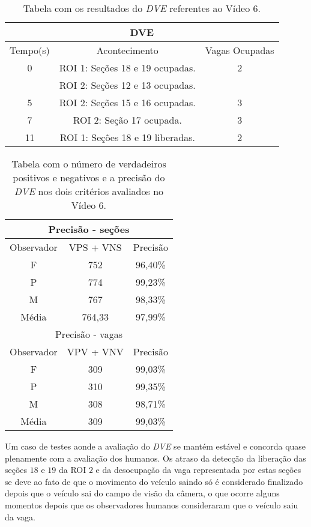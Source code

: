 \begin{table}[H]
\begin{center}
\begin{tabular}{|c||c||c|}
\hline
\multicolumn{3}{|c|}{DVE}  \\ \hline \hline
Tempo(s) & Acontecimento & Vagas Ocupadas \\ \hline
0 & ROI 1: Seções 18 e 19 ocupadas. & 2 \\
 & ROI 2: Seções 12 e 13 ocupadas. &  \\ \hline
5 & ROI 2: Seções 15 e 16 ocupadas. & 3 \\ \hline
7 & ROI 2: Seção 17 ocupada. & 3 \\ \hline
11 & ROI 1: Seções 18 e 19 liberadas. & 2 \\
\hline
\end{tabular}
\end{center}
\caption{Tabela com os resultados do \textit{DVE} referentes ao Vídeo 6.}
\label{tab:video6}
\end{table}

\begin{table}[H]
\begin{center}
\begin{tabular}{|c||c||c|}
\hline
\multicolumn{3}{|c|}{Precisão - seções}  \\ \hline
Observador & VPS + VNS & Precisão \\ \hline
F & 752 & 96,40\% \\  \hline
P & 774 & 99,23\% \\ \hline
M & 767 & 98,33\% \\ \hline
Média & 764,33 & 97,99\% \\
\hline
\hline
\multicolumn{3}{|c|}{Precisão - vagas}  \\ \hline \hline
Observador & VPV + VNV & Precisão \\ \hline
F & 309 & 99,03\% \\  \hline
P & 310 & 99,35\% \\ \hline
M & 308 & 98,71\% \\ \hline
Média & 309 & 99,03\% \\
\hline
\end{tabular}
\end{center}
\caption{Tabela com o número de verdadeiros positivos e negativos e a precisão do \textit{DVE} nos dois 
critérios avaliados no Vídeo 6.}
\label{tab:rvideo6}
\end{table}


Um caso de testes aonde a avaliação do \textit{DVE} se mantém estável e concorda quase plenamente com a avaliação dos humanos. Os atraso da detecção da liberação das seções $18$ e $19$ da ROI $2$ e da desocupação da vaga representada por estas seções se deve ao fato de que o movimento do veículo saindo só é considerado finalizado depois que o veículo sai do campo de visão da câmera, o que ocorre alguns momentos depois que os observadores humanos consideraram que o veículo saiu da vaga.

